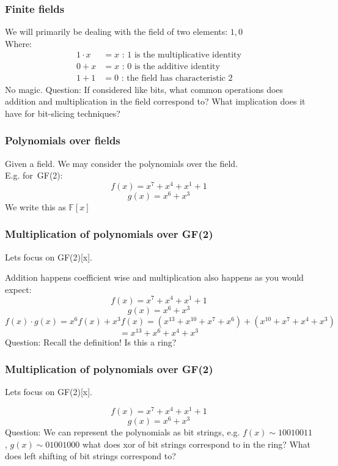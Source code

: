 \documentclass{beamer}
\begin{document}
\begin{frame}
\frametitle{Finite fields}
We will primarily be dealing with the field of two elements:
$1, 0$ \\
Where:
\begin{align}
    1 \cdot x &= x \text{ : 1 is the multiplicative identity} \\
    0 + x     &= x \text{ : 0 is the additive identity} \\
    1 + 1     &= 0 \text{ : the field has characteristic 2}
\end{align}
No magic.
Question:
If considered like bits, what common operations does
addition and multiplication in the field correspond to?
What implication does it have for bit-slicing techniques?
\end{frame}

\begin{frame}
\frametitle{Polynomials over fields}
Given a field. We may consider the polynomials over the field. \\
E.g. for\ GF(2):
\[
    f(x) = x^{7} + x^{4} + x^{1} + 1
\]
\[
    g(x) = x^{6} + x^{3}
\]
We write this as $\mathbb{F}[x]$
\end{frame}

\begin{frame}
\frametitle{Multiplication of polynomials over GF(2)}
Lets focus on GF(2)[x].

\vspace{3mm}

Addition happens coefficient wise
and multiplication also happens as you would expect:
\[
    f(x) = x^{7} + x^{4} + x^{1} + 1
\]
\[
    g(x) = x^{6} + x^{3}
\]
\[
    f(x) \cdot g(x)
    =
    x^{6} f(x) +
    x^{3} f(x)
    = (x^{13} + x^{10} + x^{7} + x^{6})
    + (x^{10} + x^{7} + x^{4} + x^{3})
\]
\[
    = x^{13} + x^{6} + x^{4} + x^{3}
\]
Question: Recall the definition! Is this a ring?
\end{frame}

\begin{frame}
\frametitle{Multiplication of polynomials over GF(2)}
Lets focus on GF(2)[x].

\vspace{3mm}

\[
    f(x) = x^{7} + x^{4} + x^{1} + 1
\]
\[
    g(x) = x^{6} + x^{3}
\]
Question: We can represent the polynomials as bit strings,
e.g.
$f(x) \sim 10010011$,
$g(x) \sim 01001000$ what does xor of bit strings correspond to in the ring?
What does left shifting of bit strings correspond to?
\end{frame}
\end{document}
